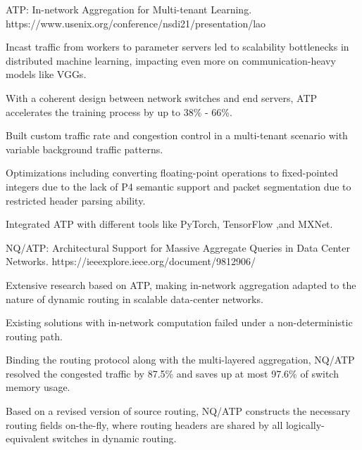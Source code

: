 \begin{cventries}
  \cventry
    {} %
    {ATP: In-network Aggregation for Multi-tenant Learning.} %
    {} %
    {https://www.usenix.org/conference\linebreak/nsdi21/presentation/lao} %
    {
      \vspace{-2mm}
      \begin{cvitems} %
        \item {Incast traffic from workers to parameter servers led to scalability bottlenecks in distributed machine learning, impacting even more on communication-heavy models like VGGs.}
        \item {With a coherent design between network switches and end servers, ATP accelerates the training process by up to 38\% - 66\%.}
        \item {Built custom traffic rate and congestion control in a multi-tenant scenario with variable background traffic patterns.}
        \item {Optimizations including converting floating-point operations to fixed-pointed integers due to the lack of P4 semantic support and packet segmentation due to restricted header parsing ability.}
        \item {Integrated ATP with different tools like PyTorch, TensorFlow ,and MXNet.}
      \end{cvitems}
    }

    \vspace{-3mm}
  
    \cventry
      {} %
      {NQ/ATP: Architectural Support for Massive Aggregate Queries in Data Center Networks.} %
      {} %
      {https://ieeexplore.ieee.org\linebreak/document/9812906/} %
      {
        \vspace{-2mm}
        \begin{cvitems} %
          \item {Extensive research based on ATP, making in-network aggregation adapted to the nature of dynamic routing in scalable data-center networks.}
          \item {Existing solutions with in-network computation failed under a non-deterministic routing path.}
          \item {Binding the routing protocol along with the multi-layered aggregation, NQ/ATP resolved the congested traffic by 87.5\% and saves up at most 97.6\% of switch memory usage.}
          \item {Based on a revised version of source routing, NQ/ATP constructs the necessary routing fields on-the-fly, where routing headers are shared by all logically-equivalent switches in dynamic routing.}
        \end{cvitems}
      }


\end{cventries}

